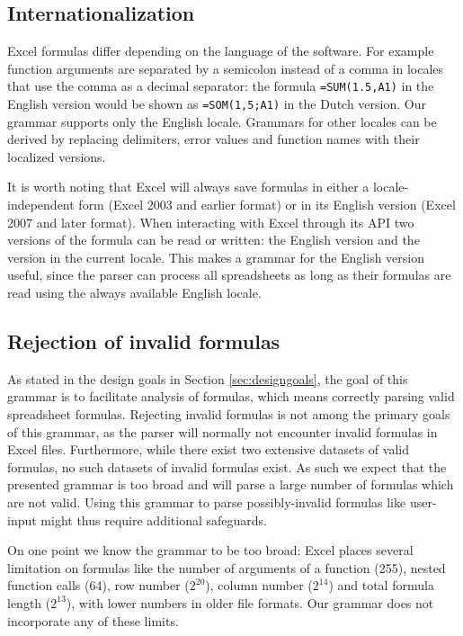 \documentclass[conference]{IEEEtran}
\begin{document}
\subsection{Internationalization}

Excel formulas differ depending on the language of the software. For example function arguments are separated by a semicolon instead of a comma in locales that use the comma as a decimal separator: the formula \texttt{=SUM(1.5,A1)} in the English version would be shown as \texttt{=SOM(1,5;A1)} in the Dutch version.
Our grammar supports only the English locale.
Grammars for other locales can be derived by replacing delimiters, error values and function names with their localized versions.

It is worth noting that Excel will always save formulas in either a locale-independent form (Excel 2003 and earlier format) or in its English version (Excel 2007 and later format). When interacting with Excel through its API two versions of the formula can be read or written: the English version and the version in the current locale.
This makes a grammar for the English version useful, since the parser can process all spreadsheets as long as their formulas are read using the always available English locale.

\subsection{Rejection of invalid formulas}

As stated in the design goals in Section \ref{sec:designgoals}, the goal of this grammar is to facilitate analysis of formulas, which means correctly parsing valid spreadsheet formulas.
Rejecting invalid formulas is not among the primary goals of this grammar, as the parser will normally not encounter invalid formulas in Excel files.
Furthermore, while there exist two extensive datasets of valid formulas, no such datasets of invalid formulas exist.
As such we expect that the presented grammar is too broad and will parse a large number of formulas which are not valid.
Using this grammar to parse possibly-invalid formulas like user-input might thus require additional safeguards.

On one point we know the grammar to be too broad: Excel places several limitation on formulas like the number of arguments of a function (255), nested function calls (64), row number ($2^{20}$), column number ($2^{14}$) and total formula length ($2^{13}$), with lower numbers in older file formats.
Our grammar does not incorporate any of these limits.
\end{document}
